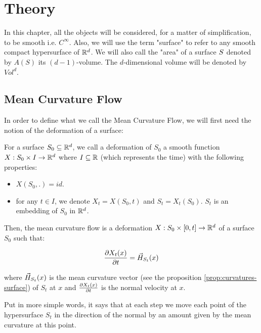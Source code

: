 \chapter{Theory}
\label{chapter:theory}

In this chapter, all the objects will be considered, for a matter of
simplification, to be smooth i.e. $ C^\infty $. Also, we will use the term
"surface" to refer to any smooth compact hypersurface of $ \mathbb{R}^d $. We will also
call the "area" of a surface $ S $ denoted by $ A(S) $ its $ (d-1)
$-volume. The $d$-dimensional volume will be denoted by $ Vol^d $.

\section{Mean Curvature Flow}

In order to define what we call the Mean Curvature Flow, we will
first need the notion of the deformation of a surface:

\begin{definition}
    For a surface $ S_0 \subseteq \mathbb{R}^d $, we call a deformation of $ S_0 $ a
    smooth function $ X : S_0 \times I \to \mathbb{R}^d $ where $ I \subseteq \mathbb{R} $
    (which represents the time) with the following properties:
    \begin{itemize}
        \item $ X(S_0, .) = id $.
        \item for any $ t \in I $, we denote $ X_t = X(S_0, t) $ and $ S_t =
            X_t(S_0) $. $ S_t $ is an embedding of $ S_0 $ in $ \mathbb{R}^d $.
    \end{itemize}
\end{definition}

Then, the mean curvature flow is a deformation $ X : S_0 \times [0, t] \to \mathbb{R}^d
$ of a surface $ S_0 $ such that:

\begin{equation}
    \frac{\partial{X_t(x)}}{\partial{t}} = \vec{H}_{S_t}(x)
\end{equation}

where $ \vec{H}_{S_t}(x) $ is the mean curvature vector (see the proposition
\ref{prop:curvatures-surface}) of $ S_t $ at $ x $ and $ \frac{\partial{X_t(x)}}{\partial{t}} $
is the normal velocity at $ x $.

Put in more simple words, it says that at each step we move each point of the
hypersurface $ S_t $ in the direction of the normal by an amount given by
the mean curvature at this point.

